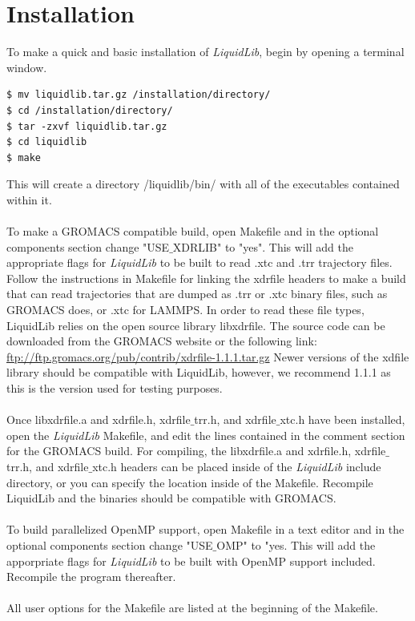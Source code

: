 \documentclass{article}
\begin{document}
\section{Installation}
To make a quick and basic installation of \textit{LiquidLib}, begin by opening a terminal window.
\begin{lstlisting}[style=BashInputStyle]
$ mv liquidlib.tar.gz /installation/directory/
$ cd /installation/directory/
$ tar -zxvf liquidlib.tar.gz
$ cd liquidlib
$ make
\end{lstlisting}
This will create a directory /liquidlib/bin/ with all of the executables contained within it.
\\
\\
To make a GROMACS compatible build, open Makefile and in the optional components section change "USE$\_$XDRLIB" to "yes".  This will add the appropriate flags for \textit{LiquidLib} to be built to read .xtc and .trr trajectory files.  Follow the instructions in Makefile for linking the xdrfile headers to make a build that can read trajectories that are dumped as .trr or .xtc binary files, such as GROMACS does, or .xtc for LAMMPS.  In order to read these file types, LiquidLib relies on the open source library libxdrfile.  The source code can be downloaded from the GROMACS website or the following link: \url{ftp://ftp.gromacs.org/pub/contrib/xdrfile-1.1.1.tar.gz} Newer versions of the xdfile library should be compatible with LiquidLib, however, we recommend 1.1.1 as this is the version used for testing purposes.
\\
\\
Once libxdrfile.a and xdrfile.h, xdrfile$\_$trr.h, and xdrfile$\_$xtc.h have been installed, open the \textit{LiquidLib} Makefile, and edit the lines contained in the comment section for the GROMACS build.  For compiling, the libxdrfile.a and xdrfile.h, xdrfile$\_$trr.h, and xdrfile$\_$xtc.h headers can be placed inside of the \textit{LiquidLib} include directory, or you can specify the location inside of the Makefile.  Recompile LiquidLib and the binaries should be compatible with GROMACS.
\\
\\
To build parallelized OpenMP support, open Makefile in a text editor and in the optional components section change "USE$\_$OMP" to "yes.  This will add the apporpriate flags for \textit{LiquidLib} to be built with OpenMP support included.  Recompile the program thereafter.
\\
\\
All user options for the Makefile are listed at the beginning of the Makefile.
\end{document}
